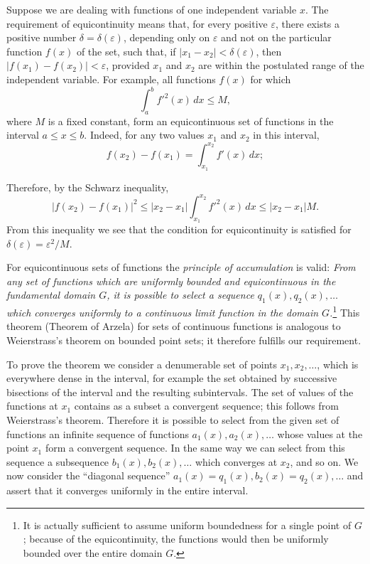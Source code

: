 Suppose we are dealing with functions of one independent variable $x$. The requirement of equicontinuity means that, for every positive $\varepsilon$, there exists a positive number $\delta=\delta(\varepsilon)$, depending only on $\varepsilon$ and not on the particular function $f(x)$ of the set, such that, if $|x_1-x_2|<\delta(\varepsilon)$, then $|f(x_1)-f(x_2)|<\varepsilon$, provided $x_1$ and $x_2$ are within the postulated range of the independent variable. For example, all functions $f(x)$ for which
\[
\int_a^b f'^2(x)\,dx\le M,
\]
where $M$ is a fixed constant, form an equicontinuous set of functions in the interval $a\le x\le b$. Indeed, for any two values $x_1$ and $x_2$ in this interval,
\[
f(x_2)-f(x_1)=\int_{x_1}^{x_2}f'(x)\,dx;
\]


Therefore, by the Schwarz inequality,
\[
|f(x_2)-f(x_1)|^2\le |x_2-x_1|\int_{x_1}^{x_2}f'^2(x)\,dx\le |x_2-x_1|M.
\]
From this inequality we see that the condition for equicontinuity is satisfied for $\delta(\varepsilon)=\varepsilon^2/M$.

For equicontinuous sets of functions the \emph{principle of accumulation} is valid: \emph{From any set of functions which are uniformly bounded and equicontinuous in the fundamental domain $G$, it is possible to select a sequence $q_1(x),q_2(x),\ldots$ which converges uniformly to a continuous limit function in the domain $G$.}\footnote{It is actually sufficient to assume uniform boundedness for a single point of $G$; because of the equicontinuity, the functions would then be uniformly bounded over the entire domain $G$.} This theorem (Theorem of Arzela) for sets of continuous functions is analogous to Weierstrass's theorem on bounded point sets; it therefore fulfills our requirement.

To prove the theorem we consider a denumerable set of points $x_1,x_2,\ldots$, which is everywhere dense in the interval, for example the set obtained by successive bisections of the interval and the resulting subintervals. The set of values of the functions at $x_1$ contains as a subset a convergent sequence; this follows from Weierstrass's theorem. Therefore it is possible to select from the given set of functions an infinite sequence of functions $a_1(x),a_2(x),\ldots$ whose values at the point $x_1$ form a convergent sequence. In the same way we can select from this sequence a subsequence $b_1(x),b_2(x),\ldots$ which converges at $x_2$, and so on. We now consider the ``diagonal sequence'' $a_1(x)=q_1(x), b_2(x)=q_2(x),\ldots$ and assert that it converges uniformly in the entire interval.

